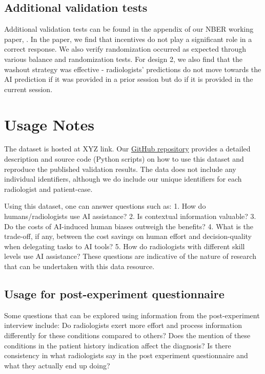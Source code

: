 \documentclass[fleqn,10pt]{wlscirep}
\begin{document}
\subsection*{Additional validation tests}

Additional validation tests can be found in the appendix of our NBER working paper, \cite{Agarwal2023-dn}. In the paper, we find that incentives do not play a significant role in a correct response. We also verify randomization occurred as expected through various balance and randomization tests. For design 2, we also find that the washout strategy was effective - radiologists’ predictions do not move towards the AI prediction if it was provided in a prior session but do if it is provided in the current session.

\section*{Usage Notes}

The dataset is hosted at XYZ link. Our \href{https://github.com/mit-econ-ai/radiology_ai_data}{GitHub repository} provides a detailed description and source code (Python scripts) on how to use this dataset and reproduce the published validation results. The data does not include any individual identifiers, although we do include our unique identifiers for each radiologist and patient-case. 

Using this dataset, one can answer questions such as: 1. How do humans/radiologists use AI assistance? 2. Is contextual information valuable? 3. Do the costs of AI-induced human biases outweigh the benefits? 4. What is the trade-off, if any, between the cost savings on human effort and decision-quality when delegating tasks to AI tools? 5. How do radiologists with different skill levels use AI assistance? These questions are indicative of the nature of research that can be undertaken with this data resource.

\subsection*{Usage for post-experiment questionnaire}

Some questions that can be explored using information from the post-experiment interview include: Do radiologists exert more effort and process information differently for these conditions compared to others? Does the mention of these conditions in the patient history indication affect the diagnosis? Is there consistency in what radiologists say in the post experiment questionnaire and what they actually end up doing? 
\end{document}
